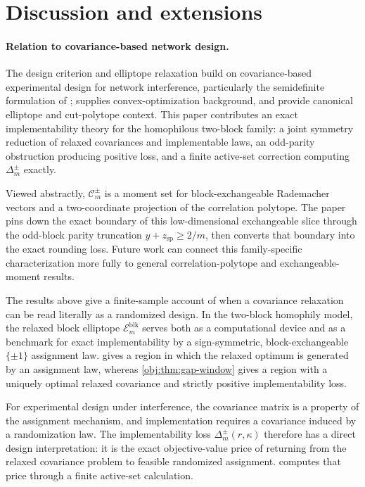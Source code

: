 \section{Discussion and extensions}

\paragraph{Relation to covariance-based network design.} The design criterion and elliptope relaxation build on covariance-based experimental design for network interference, particularly the semidefinite formulation of \citet{thiyageswaran2026}; \citet{boyd2004} supplies convex-optimization background, and \citet{goemans1995,deza1997} provide canonical elliptope and cut-polytope context. This paper contributes an exact implementability theory for the homophilous two-block family: a joint symmetry reduction of relaxed covariances and implementable laws, an odd-parity obstruction producing positive loss, and a finite active-set correction computing \(\Delta_m^{\pm}\) exactly.

Viewed abstractly, \(\mathcal C_m^{\pm}\) is a moment set for block-exchangeable Rademacher vectors and a two-coordinate projection of the correlation polytope. The paper pins down the exact boundary of this low-dimensional exchangeable slice through the odd-block parity truncation \(y+z_{\mathrm{sp}}\ge 2/m\), then converts that boundary into the exact rounding loss. Future work can connect this family-specific characterization more fully to general correlation-polytope and exchangeable-moment results.

The results above give a finite-sample account of when a covariance relaxation can be read literally as a randomized design. In the two-block homophily model, the relaxed block elliptope \(\mathcal E_m^{\mathrm{blk}}\) serves both as a computational device and as a benchmark for exact implementability by a sign-symmetric, block-exchangeable \(\{\pm1\}\) assignment law.  gives a region in which the relaxed optimum is generated by an assignment law, whereas \cref{obj:thm:gap-window} gives a region with a uniquely optimal relaxed covariance and strictly positive implementability loss.

For experimental design under interference, the covariance matrix is a property of the assignment mechanism, and implementation requires a covariance induced by a randomization law. The implementability loss \(\Delta_m^{\pm}(r,\kappa)\) therefore has a direct design interpretation: it is the exact objective-value price of returning from the relaxed covariance problem to feasible randomized assignment.  computes that price through a finite active-set calculation.

